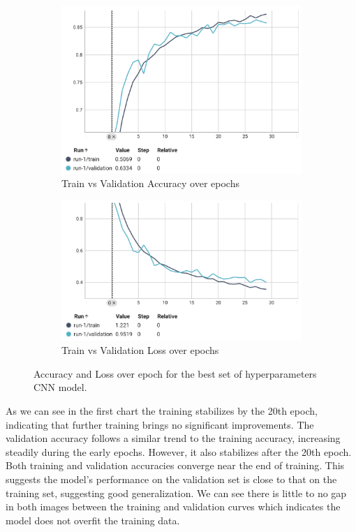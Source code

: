 \begin{figure}[H]
    \centering
    \begin{subfigure}[t]{0.35\textwidth} %
        \centering
        \includegraphics[width=\textwidth]{images/cnn_epoch_accuracy.png}
        \caption{Train vs Validation Accuracy over epochs}
        \label{fig:cnn_subfig1}
    \end{subfigure}
    \hfill
    \begin{subfigure}[t]{0.30\textwidth}
        \centering
        \includegraphics[width=\textwidth]{images/cnn_epoch_loss.png}
        \caption{Train vs Validation Loss over epochs}
        \label{fig:cnn_subfig2}
    \end{subfigure}
    \caption{Accuracy and Loss over epoch for the best set of hyperparameters CNN model.}
    \label{fig:images}
\end{figure}

As we can see in the first chart the training stabilizes by the 20th epoch, indicating that further training brings no significant improvements. The validation accuracy follows a similar trend to the training accuracy, increasing steadily during the early epochs. However, it also stabilizes after the 20th epoch. Both training and validation accuracies converge near the end of training. This suggests the model's performance on the validation set is close to that on the training set, suggesting good generalization. We can see there is little to no gap in both images between the training and validation curves which indicates the model does not overfit the training data.


